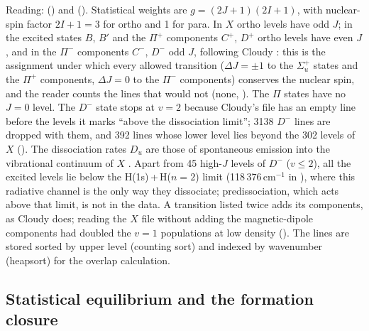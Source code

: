 Reading:  () and 
(). Statistical weights are $g=(2J+1)(2I+1)$, with
nuclear-spin factor $2I+1=3$ for ortho and 1 for para. In $X$ ortho levels have
odd $J$; in the excited states $B$, $B'$ and the $\Pi^+$ components $C^+$, $D^+$
ortho levels have even $J$, and in the $\Pi^-$ components $C^-$, $D^-$ odd $J$,
following Cloudy \citep{Shaw2005}: this is the assignment under which every
allowed transition ($\Delta J=\pm1$ to the $\Sigma_u^+$ states and the $\Pi^+$
components, $\Delta J=0$ to the $\Pi^-$ components) conserves the nuclear spin,
and the reader counts the lines that would not (none, ). The $\Pi$
states have no $J=0$ level. The $D^-$ state stops at $v=2$ because Cloudy's file
has an empty line before the levels it marks ``above the dissociation limit'';
3138 $D^-$ lines are dropped with them, and 392 lines whose lower level lies
beyond the 302 levels of $X$ (). The dissociation rates $D_u$ are
those of spontaneous emission into the vibrational continuum of $X$
\citep{Abgrall2000}. Apart from 45 high-$J$ levels of $D^-$ ($v\le2$), all the
excited levels lie below the H(1s)\,+\,H($n=2$) limit (118\,376\,cm$^{-1}$ in
), where this radiative channel is the only way they
dissociate; predissociation, which acts above that limit, is not in the data.
A transition listed
twice adds its components, as Cloudy does; reading the $X$ file without adding
the magnetic-dipole components had doubled the $v=1$ populations at low density
(). The lines are stored sorted by upper level (counting sort) and
indexed by wavenumber (heapsort) for the overlap calculation.

\subsection{Statistical equilibrium and the formation closure}
\label{sec:balance}

